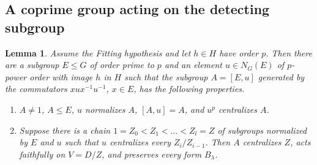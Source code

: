 \documentclass[11pt]{amsart}
\newtheorem{lemma}[theorem]{Lemma}
\theoremstyle{definition}
\theoremstyle{remark}
\begin{document}
\subsection{A coprime group acting on the detecting subgroup}

\begin{lemma}\label{lem:uA}
Assume the Fitting hypothesis and let $h\in H$ have order $p$. Then there are a subgroup $E\le G$ of order prime to $p$ and an element $u\in N_G(E)$ of $p$-power order with image $h$ in $H$ such that the subgroup $A=[E,u]$ generated by the commutators $xux^{-1}u^{-1}$, $x\in E$, has the following properties.
\begin{enumerate}
\item $A\ne1$, $A\le E$, $u$ normalizes $A$, $[A,u]=A$, and $u^p$ centralizes $A$.
\item Suppose there is a chain $1=Z_0<Z_1<\dots<Z_l=Z$ of subgroups normalized by $E$ and $u$ such that $u$ centralizes every $Z_i/Z_{i-1}$. Then $A$ centralizes $Z$, acts faithfully on $V=D/Z$, and preserves every form $B_\lambda$.
\end{enumerate}
\end{lemma}
\end{document}
